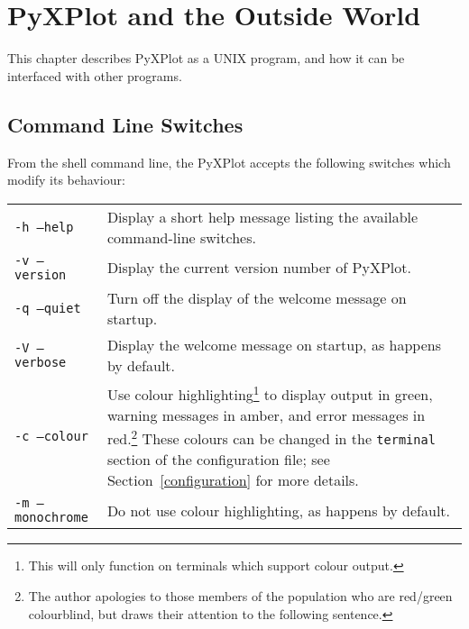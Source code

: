 %
%
%
%
%



\chapter{PyXPlot and the Outside World}
\label{gnuplot_ext_first}

This chapter describes PyXPlot as a UNIX program, and how it can be interfaced
with other programs. 

\section{Command Line Switches}

From the shell command line, the PyXPlot accepts the following switches which
modify its behaviour:

\begin{longtable}{p{3.5cm}p{8.5cm}}
{\tt -h --help} & Display a short help message listing the available command-line switches.\\
{\tt -v --version} & Display the current version number of PyXPlot.\\
{\tt -q --quiet} & Turn off the display of the welcome message on startup. \\
{\tt -V --verbose} & Display the welcome message on startup, as happens by default. \\
{\tt -c --colour} & Use colour highlighting\footnote{This will only function on terminals which support colour output.} to display output in green, warning messages in amber, and error messages in red.\footnote{The author apologies to those members of the population who are red/green colourblind, but draws their attention to the following sentence.} These colours can be changed in the {\tt terminal} section of the configuration file; see Section~\ref{configuration} for more details. \\
{\tt -m --monochrome} & Do not use colour highlighting, as happens by default. \\
\end{longtable}

